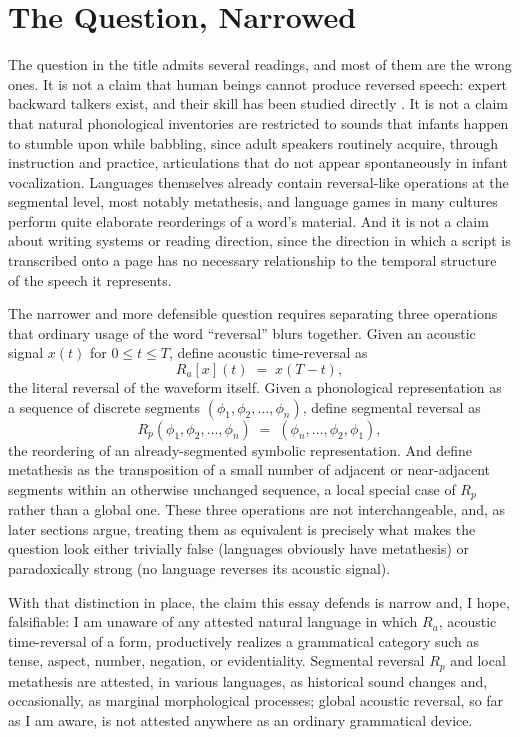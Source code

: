 \documentclass[11pt]{article}
\begin{document}
\section{The Question, Narrowed}

The question in the title admits several readings, and most of them are the wrong ones. It is not a claim that human beings cannot produce reversed speech: expert backward talkers exist, and their skill has been studied directly \citep{cowan1982,cowan1985}. It is not a claim that natural phonological inventories are restricted to sounds that infants happen to stumble upon while babbling, since adult speakers routinely acquire, through instruction and practice, articulations that do not appear spontaneously in infant vocalization. Languages themselves already contain reversal-like operations at the segmental level, most notably metathesis, and language games in many cultures perform quite elaborate reorderings of a word's material. And it is not a claim about writing systems or reading direction, since the direction in which a script is transcribed onto a page has no necessary relationship to the temporal structure of the speech it represents.

The narrower and more defensible question requires separating three operations that ordinary usage of the word ``reversal'' blurs together. Given an acoustic signal $x(t)$ for $0 \le t \le T$, define acoustic time-reversal as
\[
R_a[x](t) \;=\; x(T-t),
\]
the literal reversal of the waveform itself. Given a phonological representation as a sequence of discrete segments $(\phi_1, \phi_2, \ldots, \phi_n)$, define segmental reversal as
\[
R_p(\phi_1, \phi_2, \ldots, \phi_n) \;=\; (\phi_n, \ldots, \phi_2, \phi_1),
\]
the reordering of an already-segmented symbolic representation. And define metathesis as the transposition of a small number of adjacent or near-adjacent segments within an otherwise unchanged sequence, a local special case of $R_p$ rather than a global one. These three operations are not interchangeable, and, as later sections argue, treating them as equivalent is precisely what makes the question look either trivially false (languages obviously have metathesis) or paradoxically strong (no language reverses its acoustic signal).

With that distinction in place, the claim this essay defends is narrow and, I hope, falsifiable: I am unaware of any attested natural language in which $R_a$, acoustic time-reversal of a form, productively realizes a grammatical category such as tense, aspect, number, negation, or evidentiality. Segmental reversal $R_p$ and local metathesis are attested, in various languages, as historical sound changes and, occasionally, as marginal morphological processes; global acoustic reversal, so far as I am aware, is not attested anywhere as an ordinary grammatical device.
\end{document}
